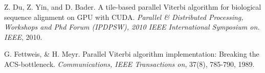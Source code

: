 \documentclass[11pt,onecolumn]{article}
\begin{document}
\begin{thebibliography}{1}
\small

Z. Du, Z. Yin, and D. Bader. A tile-based parallel Viterbi algorithm for biological sequence alignment on GPU with CUDA. \emph{Parallel \& Distributed Processing, Workshops and Phd Forum (IPDPSW), 2010 IEEE International Symposium on. IEEE}, 2010.

G. Fettweis, \& H. Meyr. Parallel Viterbi algorithm implementation: Breaking the ACS-bottleneck. \emph{Communications, IEEE Transactions on}, 37(8), 785-790,  1989.


\end{thebibliography}
\end{document}
